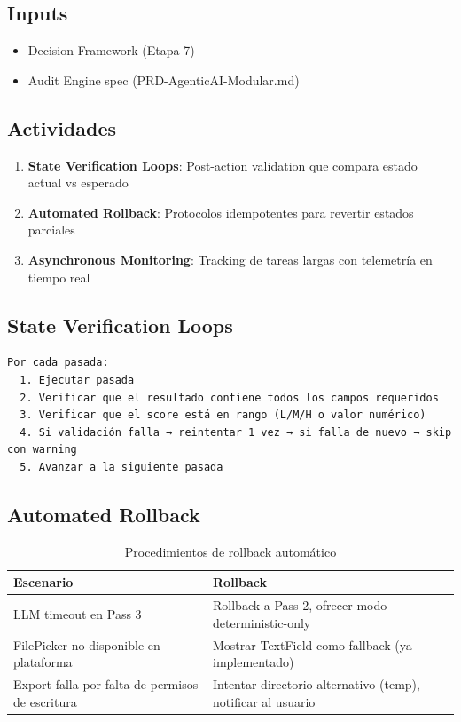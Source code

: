 \documentclass[12pt,a4paper]{article}
\begin{document}
\subsection*{Inputs}
\begin{itemize}
  \item Decision Framework (Etapa 7)
  \item Audit Engine spec (PRD-AgenticAI-Modular.md)
\end{itemize}

\subsection*{Actividades}
\begin{enumerate}
  \item \textbf{State Verification Loops}: Post-action validation que compara estado actual vs esperado
  \item \textbf{Automated Rollback}: Protocolos idempotentes para revertir estados parciales
  \item \textbf{Asynchronous Monitoring}: Tracking de tareas largas con telemetría en tiempo real
\end{enumerate}

\subsection*{State Verification Loops}
\begin{verbatim}
Por cada pasada:
  1. Ejecutar pasada
  2. Verificar que el resultado contiene todos los campos requeridos
  3. Verificar que el score está en rango (L/M/H o valor numérico)
  4. Si validación falla → reintentar 1 vez → si falla de nuevo → skip con warning
  5. Avanzar a la siguiente pasada
\end{verbatim}

\subsection*{Automated Rollback}
\begin{table}[h]
\centering
\begin{tabular}{p{} p{}}
\toprule
\textbf{Escenario} & \textbf{Rollback} \\
\midrule
LLM timeout en Pass 3      & Rollback a Pass 2, ofrecer modo deterministic-only \\
FilePicker no disponible en plataforma & Mostrar TextField como fallback (ya implementado) \\
Export falla por falta de permisos de escritura & Intentar directorio alternativo (temp), notificar al usuario \\
\bottomrule
\end{tabular}
\caption{Procedimientos de rollback automático}
\end{table}
\end{document}
